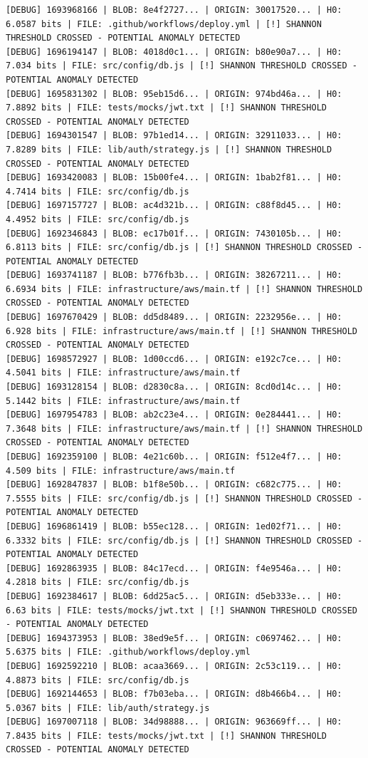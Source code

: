 \documentclass[12pt, a4paper, oneside]{report}
\begin{document}
\begin{lstlisting}[basicstyle=\tiny\ttfamily]
[DEBUG] 1693968166 | BLOB: 8e4f2727... | ORIGIN: 30017520... | H0: 6.0587 bits | FILE: .github/workflows/deploy.yml | [!] SHANNON THRESHOLD CROSSED - POTENTIAL ANOMALY DETECTED
[DEBUG] 1696194147 | BLOB: 4018d0c1... | ORIGIN: b80e90a7... | H0: 7.034 bits | FILE: src/config/db.js | [!] SHANNON THRESHOLD CROSSED - POTENTIAL ANOMALY DETECTED
[DEBUG] 1695831302 | BLOB: 95eb15d6... | ORIGIN: 974bd46a... | H0: 7.8892 bits | FILE: tests/mocks/jwt.txt | [!] SHANNON THRESHOLD CROSSED - POTENTIAL ANOMALY DETECTED
[DEBUG] 1694301547 | BLOB: 97b1ed14... | ORIGIN: 32911033... | H0: 7.8289 bits | FILE: lib/auth/strategy.js | [!] SHANNON THRESHOLD CROSSED - POTENTIAL ANOMALY DETECTED
[DEBUG] 1693420083 | BLOB: 15b00fe4... | ORIGIN: 1bab2f81... | H0: 4.7414 bits | FILE: src/config/db.js
[DEBUG] 1697157727 | BLOB: ac4d321b... | ORIGIN: c88f8d45... | H0: 4.4952 bits | FILE: src/config/db.js
[DEBUG] 1692346843 | BLOB: ec17b01f... | ORIGIN: 7430105b... | H0: 6.8113 bits | FILE: src/config/db.js | [!] SHANNON THRESHOLD CROSSED - POTENTIAL ANOMALY DETECTED
[DEBUG] 1693741187 | BLOB: b776fb3b... | ORIGIN: 38267211... | H0: 6.6934 bits | FILE: infrastructure/aws/main.tf | [!] SHANNON THRESHOLD CROSSED - POTENTIAL ANOMALY DETECTED
[DEBUG] 1697670429 | BLOB: dd5d8489... | ORIGIN: 2232956e... | H0: 6.928 bits | FILE: infrastructure/aws/main.tf | [!] SHANNON THRESHOLD CROSSED - POTENTIAL ANOMALY DETECTED
[DEBUG] 1698572927 | BLOB: 1d00ccd6... | ORIGIN: e192c7ce... | H0: 4.5041 bits | FILE: infrastructure/aws/main.tf
[DEBUG] 1693128154 | BLOB: d2830c8a... | ORIGIN: 8cd0d14c... | H0: 5.1442 bits | FILE: infrastructure/aws/main.tf
[DEBUG] 1697954783 | BLOB: ab2c23e4... | ORIGIN: 0e284441... | H0: 7.3648 bits | FILE: infrastructure/aws/main.tf | [!] SHANNON THRESHOLD CROSSED - POTENTIAL ANOMALY DETECTED
[DEBUG] 1692359100 | BLOB: 4e21c60b... | ORIGIN: f512e4f7... | H0: 4.509 bits | FILE: infrastructure/aws/main.tf
[DEBUG] 1692847837 | BLOB: b1f8e50b... | ORIGIN: c682c775... | H0: 7.5555 bits | FILE: src/config/db.js | [!] SHANNON THRESHOLD CROSSED - POTENTIAL ANOMALY DETECTED
[DEBUG] 1696861419 | BLOB: b55ec128... | ORIGIN: 1ed02f71... | H0: 6.3332 bits | FILE: src/config/db.js | [!] SHANNON THRESHOLD CROSSED - POTENTIAL ANOMALY DETECTED
[DEBUG] 1692863935 | BLOB: 84c17ecd... | ORIGIN: f4e9546a... | H0: 4.2818 bits | FILE: src/config/db.js
[DEBUG] 1692384617 | BLOB: 6dd25ac5... | ORIGIN: d5eb333e... | H0: 6.63 bits | FILE: tests/mocks/jwt.txt | [!] SHANNON THRESHOLD CROSSED - POTENTIAL ANOMALY DETECTED
[DEBUG] 1694373953 | BLOB: 38ed9e5f... | ORIGIN: c0697462... | H0: 5.6375 bits | FILE: .github/workflows/deploy.yml
[DEBUG] 1692592210 | BLOB: acaa3669... | ORIGIN: 2c53c119... | H0: 4.8873 bits | FILE: src/config/db.js
[DEBUG] 1692144653 | BLOB: f7b03eba... | ORIGIN: d8b466b4... | H0: 5.0367 bits | FILE: lib/auth/strategy.js
[DEBUG] 1697007118 | BLOB: 34d98888... | ORIGIN: 963669ff... | H0: 7.8435 bits | FILE: tests/mocks/jwt.txt | [!] SHANNON THRESHOLD CROSSED - POTENTIAL ANOMALY DETECTED
\end{lstlisting}
\end{document}
